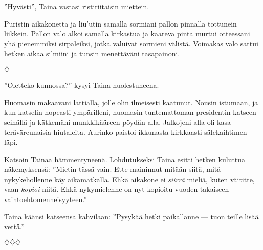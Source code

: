 ﻿\documentclass[a4paper, 12pt, finnish]{article}
\newcommand{\q}[1]{''#1''}
\def\jump{\vspace{2mm} \centerline{$\diamondsuit$} \vspace{2mm}}
\def\endjump{\vspace{2mm} \centerline{$\diamondsuit\diamondsuit\diamondsuit$} \vspace{2mm}}
\begin{document}
\q{Hyvästi}, Taina vastasi ristiriitaisin miettein.

Puristin aikakonetta ja liu'utin samalla sormiani pallon pinnalla
tottunein liikkein. Pallon valo alkoi samalla kirkastua ja kaareva
pinta murtui otteessani yhä pienemmiksi sirpaleiksi,
jotka valuivat sormieni välistä. Voimakas valo sattui hetken aikaa
silmiini ja tunsin menettäväni tasapainoni.


\jump


\q{Oletteko kunnossa?} kysyi Taina huolestuneena.

Huomasin makaavani
lattialla, jolle olin ilmeisesti kaatunut. Nousin istumaan, ja
kun katselin nopeasti ympärilleni, huomasin tuntemattoman
presidentin katseen seinällä ja kätkemäni munkkikääreen pöydän alla.
Jalkojeni alla oli kasa teräväreunaisia hiutaleita.
Aurinko paistoi ikkunasta kirkkaasti sälekaihtimen läpi.

Katsoin Tainaa hämmentyneenä. Lohdutukseksi Taina esitti hetken
kuluttua näkemyksensä: \q{Mietin tässä vain.
Ette maininnut mitään siitä, mitä nykykehollenne käy aikamatkalla.
Ehkä aikakone ei \emph{siirrä} mieliä, kuten väititte,
vaan \emph{kopioi} niitä. Ehkä nykymielenne on nyt kopioitu
vuoden takaiseen vaihtoehtomenneisyyteen.}

Taina käänsi katseensa kahvilaan:
\q{Pysykää hetki paikallanne --- tuon teille lisää vettä.}


\endjump
\end{document}
